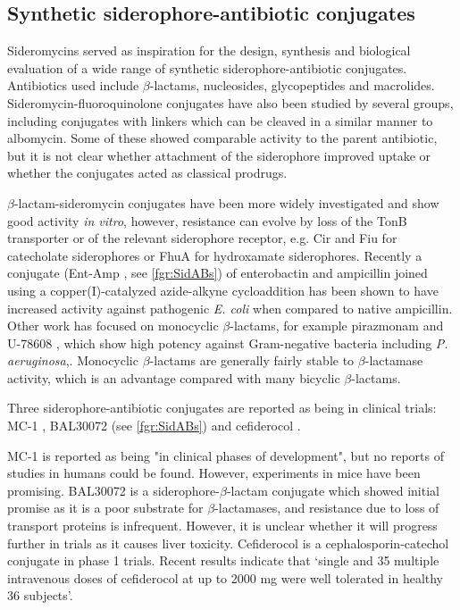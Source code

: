 \subsection{Synthetic siderophore-antibiotic conjugates\label{sec:sidABs}}

Sideromycins served as inspiration for the design, synthesis and biological evaluation of a wide range of synthetic siderophore-antibiotic conjugates\cite{Page2013}. Antibiotics used include $\beta$-lactams\cite{Mollmann2009,Dini2000,Kline2000}, nucleosides\cite{Lu1999}, glycopeptides\cite{Ghosh1996} and macrolides\cite{Ghosh1995}. Sideromycin-fluoroquinolone conjugates have also been studied by several groups\cite{Md-Saleh2009,Rivault2007,Ji2012}, including conjugates with linkers which can be cleaved\cite{Rivault2007,Ji2012} in a similar manner to albomycin\cite{Hartmann1979}. Some of these showed comparable activity to the parent antibiotic, but it is not clear whether attachment of the siderophore improved uptake or whether the conjugates acted as classical prodrugs.

$\beta$-lactam-sideromycin conjugates have been more widely investigated and show good activity \textit{in vitro}, however, resistance can evolve by loss of the TonB transporter or of the relevant siderophore receptor, e.g. Cir and Fiu for catecholate siderophores or FhuA for hydroxamate siderophores\cite{Page2013}. 
Recently a conjugate (Ent-Amp , see \ref{fgr:SidABs}) of enterobactin and ampicillin joined using a copper(I)-catalyzed azide-alkyne cycloaddition has been shown to have increased activity against pathogenic \textit{E. coli} when compared to native ampicillin\cite{Zheng2014}. 
Other work has focused on monocyclic $\beta$-lactams, for example pirazmonam  and U-78608 , which show high potency against Gram-negative bacteria including \textit{P. aeruginosa},\cite{Zurenko1990,Harrington2012}. Monocyclic $\beta$-lactams are generally fairly stable to $\beta$-lactamase activity, which is an advantage compared with many bicyclic $\beta$-lactams.

Three siderophore-antibiotic conjugates are reported as being in clinical trials\cite{Schalk2017}: MC-1 \cite{McPherson2012}, BAL30072 \cite{Page2013} (see \ref{fgr:SidABs}) and cefiderocol \cite{Ito2018,Saisho2018}.

MC-1  is reported as being "in clinical phases of development"\cite{Schalk2017}, but no reports of studies in humans could be found. However, experiments in mice have been promising\cite{McPherson2012}.
BAL30072  is a siderophore-$\beta$-lactam conjugate which showed initial promise as it is a poor substrate for $\beta$-lactamases, and resistance due to loss of transport proteins is infrequent\cite{Page2013}. However, it is unclear whether it will progress further in trials as it causes liver toxicity\cite{Paech2017}. 
Cefiderocol  is a cephalosporin-catechol conjugate in phase 1 trials. Recent results indicate that `single and 35 multiple intravenous doses of cefiderocol at up to 2000 mg were well tolerated in healthy 36 subjects'\cite{Saisho2018}.

